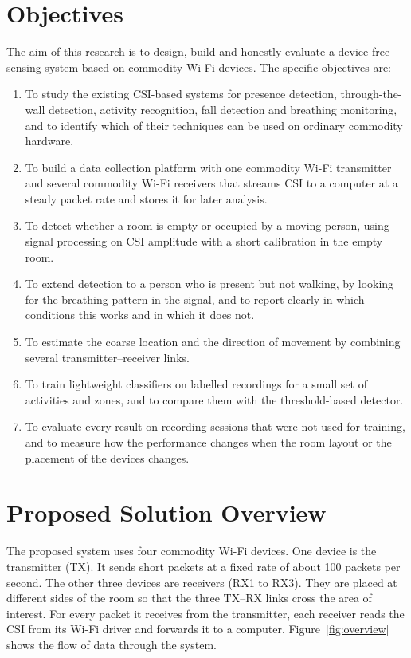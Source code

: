 \section{Objectives}
The aim of this research is to design, build and honestly evaluate a device-free sensing system based on commodity Wi-Fi devices. The specific objectives are:
\begin{enumerate}
  \item To study the existing CSI-based systems for presence detection, through-the-wall detection, activity recognition, fall detection and breathing monitoring, and to identify which of their techniques can be used on ordinary commodity hardware.
  \item To build a data collection platform with one commodity Wi-Fi transmitter and several commodity Wi-Fi receivers that streams CSI to a computer at a steady packet rate and stores it for later analysis.
  \item To detect whether a room is empty or occupied by a moving person, using signal processing on CSI amplitude with a short calibration in the empty room.
  \item To extend detection to a person who is present but not walking, by looking for the breathing pattern in the signal, and to report clearly in which conditions this works and in which it does not.
  \item To estimate the coarse location and the direction of movement by combining several transmitter--receiver links.
  \item To train lightweight classifiers on labelled recordings for a small set of activities and zones, and to compare them with the threshold-based detector.
  \item To evaluate every result on recording sessions that were not used for training, and to measure how the performance changes when the room layout or the placement of the devices changes.
\end{enumerate}

\section{Proposed Solution Overview}
The proposed system uses four commodity Wi-Fi devices. One device is the transmitter (TX). It sends short packets at a fixed rate of about 100 packets per second. The other three devices are receivers (RX1 to RX3). They are placed at different sides of the room so that the three TX--RX links cross the area of interest. For every packet it receives from the transmitter, each receiver reads the CSI from its Wi-Fi driver and forwards it to a computer. Figure~\ref{fig:overview} shows the flow of data through the system.

